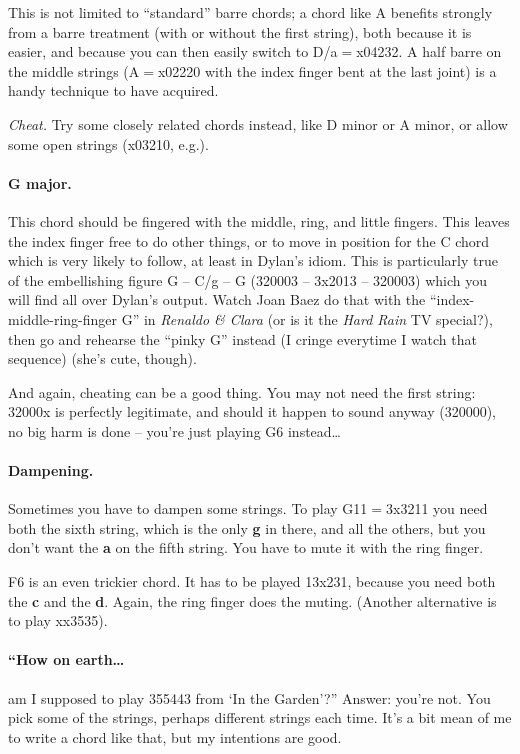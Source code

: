 This is not limited to ``{}standard''{} barre chords; a chord like A
benefits strongly from a barre treatment (with or without the first
string), both because it is easier, and because you can then easily
switch to D/a$=$x04232. A half barre on the middle strings (A$=$x02220
with the index finger bent at the last joint) is a handy technique to
have acquired.

\emph{Cheat.} Try some closely related chords instead, like D minor or
A minor, or allow some open strings (x03210, e.g.).


\paragraph*{G major.} This chord should be fingered with the middle, ring,
and little fingers. This leaves the index finger free to do other
things, or to move in position for the C chord which is very likely to
follow, at least in Dylan's idiom. This is particularly true of the
embellishing figure G -- C/g -- G (320003 -- 3x2013 -- 320003) which
you will find all over Dylan's output. Watch Joan Baez do that with
the ``{}index-middle-ring-finger G''{} in \emph{Renaldo \& Clara }(or is it the
\emph{Hard Rain }TV special?), then go and rehearse the ``{}pinky
G''{} instead (I cringe everytime I watch that sequence) (she's cute, though).

And again, cheating can be a good thing. You may not need the first
string: 32000x is perfectly legitimate, and should it happen to sound
anyway (320000), no big harm is done -- you're just playing G6
instead\ldots{}


\paragraph*{Dampening.} Sometimes you have to dampen some strings. To play
G11$=$3x3211 you need both the sixth string, which is the only
\textbf{g} in there, and all the others, but you don't want the
\textbf{a} on the fifth string. You have to mute it with the ring
finger.

F6 is an even trickier chord. It has to be played 13x231, because you
need both the \textbf{c} and the \textbf{d}. Again, the ring finger
does the muting. (Another alternative is to play xx3535).

\paragraph*{``How on earth\ldots} am I supposed to play 355443 from
`In the Garden'?'' Answer: you're not. You pick some of the strings, perhaps
different strings each time. It's a bit mean of me to write a chord
like that, but my intentions are good.

